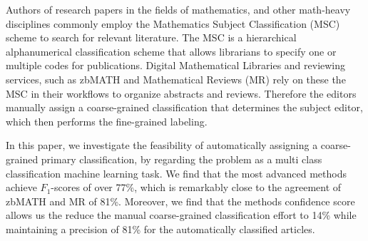 Authors of research papers in the fields of mathematics, and other math-heavy disciplines commonly employ the Mathematics Subject Classification (MSC) scheme to search for relevant literature.
The MSC is a hierarchical alphanumerical classification scheme that allows librarians to specify one or multiple codes for publications.
Digital Mathematical Libraries and reviewing services, such as zbMATH and Mathematical Reviews (MR) rely on these the MSC in their workflows to organize abstracts and reviews.
Therefore the editors manually assign a coarse-grained classification that determines the subject editor, which then performs the fine-grained labeling.

In this paper, we investigate the feasibility of automatically assigning a coarse-grained primary classification, by regarding the problem as a multi class classification machine learning task.
We find that the most advanced methods achieve \(F_{1}\)-scores of over 77\%, which is remarkably close to the agreement of zbMATH and MR of 81\%.
Moreover, we find that the methods confidence score allows us the reduce the manual coarse-grained classification effort to 14\% while maintaining a precision of 81\% for the automatically classified articles.
